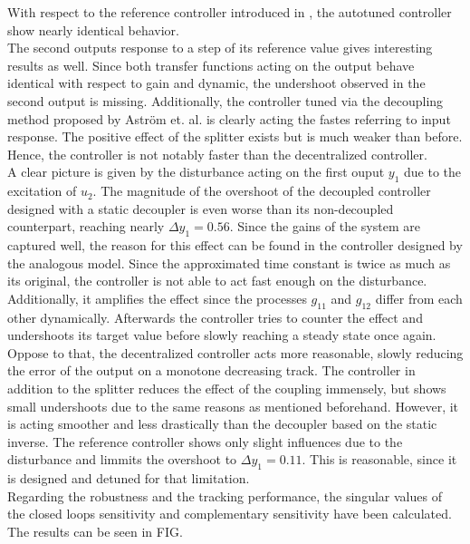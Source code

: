 With respect to the reference controller introduced in \cite{Astrom2001a}, the autotuned controller show nearly identical behavior.\\

The second outputs response to a step of its reference value gives interesting results as well. Since both transfer functions acting on the output behave identical with respect to gain and dynamic, the undershoot observed in the second output is missing. Additionally, the controller tuned via the decoupling method proposed by Astr\"om et. al. is clearly acting the fastes referring to input response. The positive effect of the splitter exists but is much weaker than before. Hence, the controller is not notably faster than the decentralized controller.\\

A clear picture is given by the disturbance acting on the first ouput $y_1$ due to the excitation of $u_2$. The magnitude of the overshoot of the decoupled controller designed with a static decoupler is even worse than its non-decoupled counterpart, reaching nearly $\Delta y_1 = 0.56$. Since the gains of the system are captured well, the reason for this effect can be found in the controller designed by the analogous model. Since the approximated time constant is twice as much as its original, the controller is not able to act fast enough on the disturbance. Additionally, it amplifies the effect since the processes $g_{11}$ and $g_{12}$ differ from each other dynamically. Afterwards the controller tries to counter the effect and undershoots its target value before slowly reaching a steady state once again.\\

Oppose to that, the decentralized controller acts more reasonable, slowly reducing the error of the output on a monotone decreasing track. The controller in addition to the splitter reduces the effect of the coupling immensely, but shows small undershoots due to the same reasons as mentioned beforehand. However, it is acting smoother and less drastically than the decoupler based on the static inverse. The reference controller shows only slight influences due to the disturbance and limmits the overshoot to $\Delta y_1 = 0.11$. This is reasonable, since it is designed and detuned for that limitation.\\

Regarding the robustness and the tracking performance, the singular values of the closed loops sensitivity and complementary sensitivity have been calculated. The results can be seen in FIG.\\

